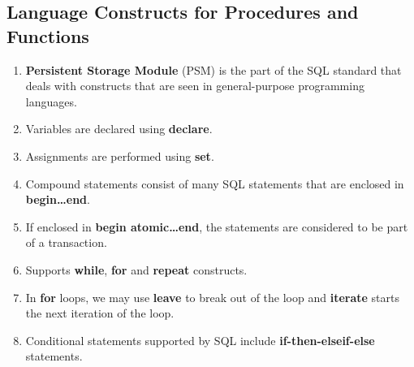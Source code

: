 \documentclass[journal,12pt,twocolumn]{IEEEtran}
\begin{document}
\subsection{Language Constructs for Procedures and Functions}
\begin{enumerate}
     \item \textbf{Persistent Storage Module} (PSM) is the part of the SQL 
     standard that deals with constructs that are seen in general-purpose 
     programming languages.
     \item Variables are declared using \textbf{declare}.
     \item Assignments are performed using \textbf{set}.
     \item Compound statements consist of many SQL statements that are
     enclosed in \textbf{begin\ldots end}.
     \item If enclosed in \textbf{begin atomic\ldots end}, the statements are
     considered to be part of a transaction.
     \item Supports \textbf{while}, \textbf{for} and \textbf{repeat} constructs.
     \item In \textbf{for} loops, we may use \textbf{leave} to break out of the
     loop and \textbf{iterate} starts the next iteration of the loop.
     \item Conditional statements supported by SQL include 
     \textbf{if-then-elseif-else} statements.
\end{enumerate}
\end{document}
